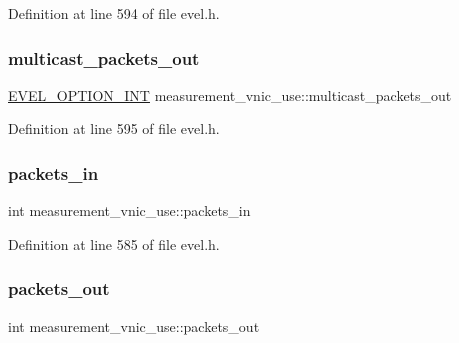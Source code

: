 Definition at line 594 of file evel.\+h.

\hypertarget{structmeasurement__vnic__use_aae71f8b2a7af31ed1c70be76e5021db5}{}\label{structmeasurement__vnic__use_aae71f8b2a7af31ed1c70be76e5021db5} 
\subsubsection{\texorpdfstring{multicast\+\_\+packets\+\_\+out}{multicast\_packets\_out}}
{\footnotesize\ttfamily \hyperlink{evel_8h_a452d825778d1c2368a54b8f689a25ba7}{E\+V\+E\+L\+\_\+\+O\+P\+T\+I\+O\+N\+\_\+\+I\+NT} measurement\+\_\+vnic\+\_\+use\+::multicast\+\_\+packets\+\_\+out}



Definition at line 595 of file evel.\+h.

\hypertarget{structmeasurement__vnic__use_a3b7f900c41afff86c33dec3e211bc7c8}{}\label{structmeasurement__vnic__use_a3b7f900c41afff86c33dec3e211bc7c8} 
\subsubsection{\texorpdfstring{packets\+\_\+in}{packets\_in}}
{\footnotesize\ttfamily int measurement\+\_\+vnic\+\_\+use\+::packets\+\_\+in}



Definition at line 585 of file evel.\+h.

\hypertarget{structmeasurement__vnic__use_a2cf0c13cafa8e5118a2216cc46bd0e89}{}\label{structmeasurement__vnic__use_a2cf0c13cafa8e5118a2216cc46bd0e89} 
\subsubsection{\texorpdfstring{packets\+\_\+out}{packets\_out}}
{\footnotesize\ttfamily int measurement\+\_\+vnic\+\_\+use\+::packets\+\_\+out}



